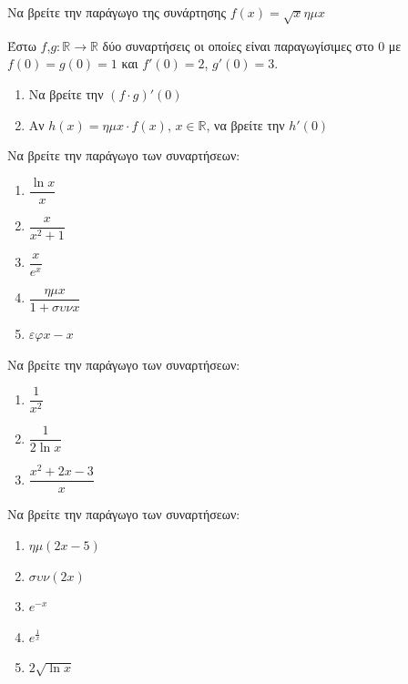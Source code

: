 \documentclass{presentation}
\begin{document}
\begin{askisi}
  Να βρείτε την παράγωγο της συνάρτησης $f(x)=\sqrt{x}ημx$

\end{askisi}

\begin{askisi}
  Έστω $f$,$g:\mathbb{R}\to\mathbb{R}$ δύο συναρτήσεις οι οποίες είναι παραγωγίσιμες στο $0$ με $f(0)=g(0)=1$ και $f'(0)=2$, $g'(0)=3$.

  \begin{enumerate}
    \item<1-> Να βρείτε την $(f\cdot g)'(0)$
    \item<2-> Αν $h(x)=ημx \cdot f(x)$, $x\in\mathbb{R}$, να βρείτε την $h'(0)$
  \end{enumerate}

\end{askisi}

\begin{askisi}
  Να βρείτε την παράγωγο των συναρτήσεων:
  \begin{enumerate}
    \item<1-> $\dfrac{\ln x}{x}$
    \item<2-> $\dfrac{x}{x^2+1}$
    \item<3-> $\dfrac{x}{e^x}$
    \item<4-> $\dfrac{ημx}{1+συνx}$
    \item<5-> $εφx-x$
  \end{enumerate}

\end{askisi}

\begin{askisi}
  Να βρείτε την παράγωγο των συναρτήσεων:
  \begin{enumerate}
    \item<1-> $\dfrac{1}{x^2}$
    \item<2-> $\dfrac{1}{2\ln x}$
    \item<3-> $\dfrac{x^2+2x-3}{x}$
  \end{enumerate}

\end{askisi}

\begin{askisi}
  Να βρείτε την παράγωγο των συναρτήσεων:
  \begin{enumerate}
    \item<1-> $ημ(2x-5)$
    \item<2-> $συν(2x)$
    \item<3-> $e^{-x}$
    \item<4-> $e^{\frac{1}{x}}$
    \item<5-> $2\sqrt{\ln x}$
  \end{enumerate}

\end{askisi}
\end{document}
